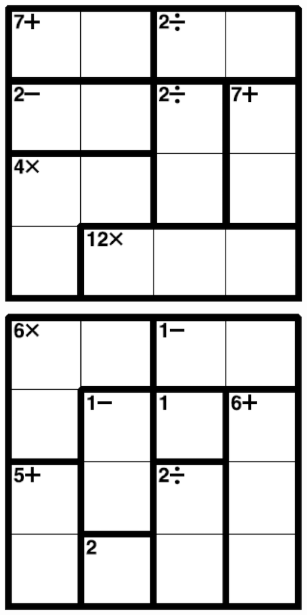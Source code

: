 
\includegraphics[scale=1]{Gambar/Lampiran/4x4_23.png}

\includegraphics[scale=1]{Gambar/Lampiran/4x4_24.png}
